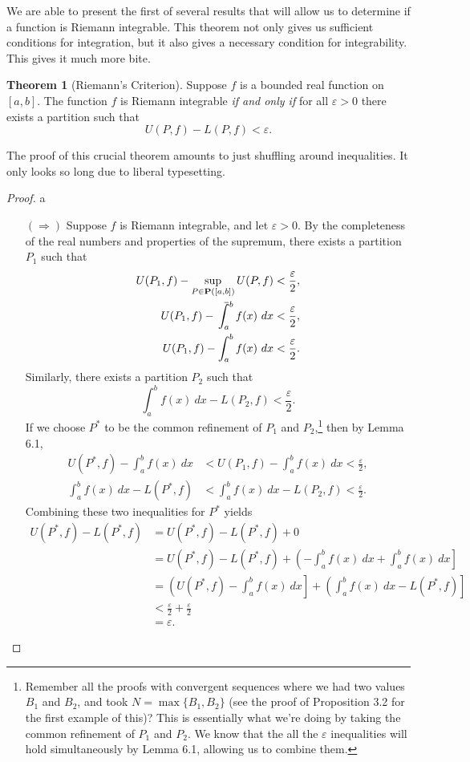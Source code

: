 \documentclass{article}
\def\upint{\mathchoice%
	{\mkern13mu\overline{\vphantom{\intop}\mkern7mu}\mkern-20mu}%
	{\mkern7mu\overline{\vphantom{\intop}\mkern7mu}\mkern-14mu}%
	{\mkern7mu\overline{\vphantom{\intop}\mkern7mu}\mkern-14mu}%
	{\mkern7mu\overline{\vphantom{\intop}\mkern7mu}\mkern-14mu}%
	\int}
\theoremstyle{definition}
\newtheorem{theorem}{Theorem}[section]
\begin{document}
	We are able to present the first of several results that will allow us to determine if a function is Riemann integrable. This theorem not only gives us sufficient conditions for integration, but it also gives a necessary condition for integrability. This gives it much more bite. 
	\begin{theorem}[Riemann's Criterion]
		Suppose $ f $ is a bounded real function on $ [a,b] $. The function $ f $ is Riemann integrable \textit{if and only if} for all $ \varepsilon>0 $ there exists a partition such that $$ U(P,f)-L(P,f)<\varepsilon.$$
	\end{theorem} The proof of this crucial theorem amounts to just shuffling around inequalities. It only looks so long due to liberal typesetting.  
	\begin{proof}{\color{white}a}
		\begin{enumerate}
			\item [$ (\Longrightarrow) $] Suppose $ f $ is Riemann integrable, and let $ \varepsilon>0 $. By the completeness of the real numbers and properties of the supremum, there exists a partition $ P_1 $ such that \begin{align*}
				U(P_1,f)-\sup\limits_{P\in\textbf{P}([a,b])}U(P,f)&<\frac{\varepsilon}{2},\\
				U(P_1,f)-\upint_a^b f(x)\ dx&<\frac{\varepsilon}{2},\\
				U(P_1,f)-\int_a^b f(x)\ dx&<\frac{\varepsilon}{2}.
			\end{align*} 
			Similarly, there exists a partition $ P_2 $ such that $$\int_a^bf(x)\ dx-L(P_2,f)<\frac{\varepsilon}{2}. $$ If we choose $ P^* $ to be the common refinement of $ P_1 $ and $ P_2 $,\footnote{Remember all the proofs with convergent sequences where we had two values $ B_1 $ and $ B_2 $, and took $ N=\max\{B_1,B_2\} $ (see the proof of Proposition 3.2 for the first example of this)? This is essentially what we're doing by taking the common refinement of $ P_1 $ and $ P_2 $. We know that the all the $ \varepsilon $ inequalities will hold simultaneously by Lemma 6.1, allowing us to combine them.} then by Lemma 6.1, \begin{align*}
				U(P^*,f)-\int_a^b f(x)\ dx&<U(P_1,f)-\int_a^b f(x)\ dx<\frac{\varepsilon}{2},\\\int_a^bf(x)\ dx-L(P^*,f)&<\int_a^bf(x)\ dx-L(P_2,f)<\frac{\varepsilon}{2}.
			\end{align*}
			Combining these two inequalities for $ P^* $ yields
			\begin{align*}
				U(P^*,f)-L(P^*,f)&=U(P^*,f)-L(P^*,f)+0\\&=U(P^*,f)-L(P^*,f)+\left(-\int_a^b f(x)\ dx+\int_a^bf(x)\ dx\right]\\&=\left(U(P^*,f)-\int_a^b f(x)\ dx\right]+\left(\int_a^bf(x)\ dx-L(P^*,f)\right]\\&<\frac{\varepsilon}{2}+\frac{\varepsilon}{2}\\&=\varepsilon.

\end{align*}
\end{enumerate}
\end{proof}
\end{document}
